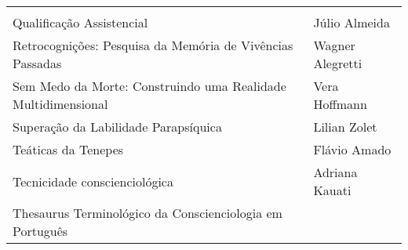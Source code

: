 \documentclass[
]{article}
\begin{document}
\begin{longtable}[]{@{}
  >{\raggedright\arraybackslash}p{}
  >{\raggedright\arraybackslash}p{}@{}}
\begin{minipage}[b]{\linewidth}
\end{minipage} \\
\begin{minipage}[b]{\linewidth}\raggedright
Qualificação Assistencial
\end{minipage} & \begin{minipage}[b]{\linewidth}\raggedright
Júlio Almeida
\end{minipage} \\
\begin{minipage}[b]{\linewidth}\raggedright
Retrocognições: Pesquisa da Memória de Vivências Passadas
\end{minipage} & \begin{minipage}[b]{\linewidth}\raggedright
Wagner Alegretti
\end{minipage} \\
\begin{minipage}[b]{\linewidth}\raggedright
Sem Medo da Morte: Construindo uma Realidade Multidimensional
\end{minipage} & \begin{minipage}[b]{\linewidth}\raggedright
Vera Hoffmann
\end{minipage} \\
\begin{minipage}[b]{\linewidth}\raggedright
Superação da Labilidade Parapsíquica
\end{minipage} & \begin{minipage}[b]{\linewidth}\raggedright
Lilian Zolet
\end{minipage} \\
\begin{minipage}[b]{\linewidth}\raggedright
Teáticas da Tenepes
\end{minipage} & \begin{minipage}[b]{\linewidth}\raggedright
Flávio Amado
\end{minipage} \\
\begin{minipage}[b]{\linewidth}\raggedright
Tecnicidade conscienciológica
\end{minipage} & \begin{minipage}[b]{\linewidth}\raggedright
Adriana Kauati
\end{minipage} \\
\begin{minipage}[b]{\linewidth}\raggedright
Thesaurus Terminológico da Conscienciologia em Português
\end{minipage} & \begin{minipage}[b]{\linewidth}\raggedright

\end{minipage}
\end{longtable}
\end{document}
